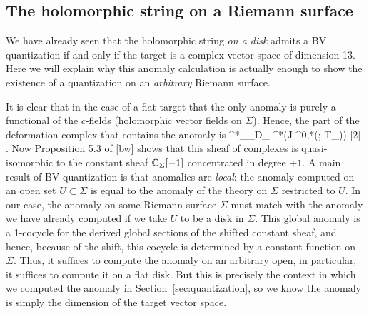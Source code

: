 
\subsection{The holomorphic string on a Riemann surface}

We have already seen that the holomorphic string {\it on a disk} admits a BV quantization if and only if the target is a complex vector space of dimension 13.
Here we will explain why this anomaly calculation is actually enough to show the existence of a quantization on an {\it arbitrary} Riemann surface. 

It is clear that  in the case of a flat target that the only anomaly is purely a functional of the $c$-fields (holomorphic vector fields on $\Sigma$).
Hence, the part of the deformation complex that contains the anomaly is
\ben
\Omega^{*}_\Sigma \tensor_{D_\Sigma} \cred^*(J \Omega^{0,*}(\Sigma ; T_\Sigma)) [2] .
\een
Now Proposition 5.3 of \ref{bw} shows that this sheaf of complexes is quasi-isomorphic to the constant sheaf $\mathbb C_\Sigma[-1]$ concentrated in degree $+1$. 
A main result of BV quantization \cite{CosBook}  is that anomalies are {\em local}: the anomaly computed on an open set $U \subset \Sigma$ is equal to the anomaly of the theory on $\Sigma$ restricted to $U$. 
In our case, the anomaly on some Riemann surface $\Sigma$ must match with the anomaly we have already computed if we take $U$ to be a disk in $\Sigma$.
This global anomaly is a 1-cocycle for the derived global sections of the shifted constant sheaf, 
and hence, because of the shift, this cocycle is determined by a constant function on $\Sigma$.
Thus, it suffices to compute the anomaly on an arbitrary open, 
in particular, it suffices to compute it on a flat disk. 
But this is precisely the context in which we computed the anomaly in Section~\ref{sec:quantization}, 
so we know the anomaly is simply the dimension of the target vector space.

